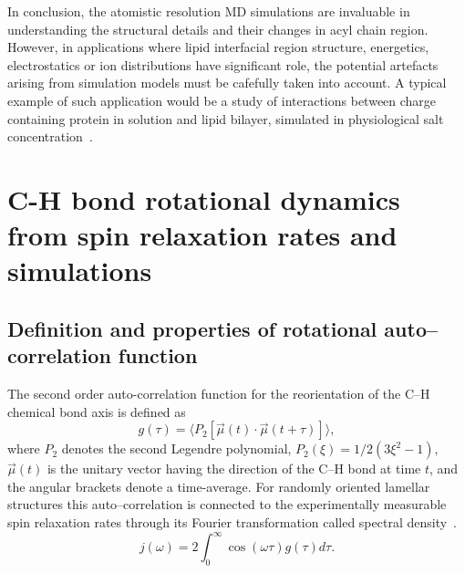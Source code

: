 \documentclass[aps,prl,superscriptaddress,twocolumn]{revtex4}
\begin{document}
In conclusion, the atomistic resolution MD simulations are invaluable in understanding the 
structural details and their changes in acyl chain region. However, in applications where 
lipid interfacial region structure, energetics, electrostatics or ion distributions have significant role,
the potential artefacts arising from simulation models must be cafefully taken into account.
A typical example of such application would be a study of interactions between charge containing protein in solution
and lipid bilayer, simulated in physiological salt concentration~\cite{arkhipov13,kaszuba15}.


\section{C-H bond rotational dynamics from spin relaxation rates and simulations}\label{dynamicsSECTION}

\subsection{Definition and properties of rotational auto--correlation function}
The second order auto-correlation function for the reorientation of the C--H chemical bond axis is defined as
\begin{equation}\label{gt}
g(\tau) = \langle P_2[\vec{\mu}(t)\cdot\vec{\mu}(t+\tau)]\rangle,
\end{equation} 
where $P_2$ denotes the second Legendre polynomial, $P_2(\xi) = 1/2 (3\xi^2 - 1)$, $\vec{\mu}(t)$ is the unitary vector having the 
direction of the C--H bond at time $t$, and the angular brackets denote a time-average. 
For randomly oriented lamellar structures this auto--correlation is connected to the experimentally 
measurable spin relaxation rates through its Fourier transformation called spectral density~\cite{harris86}.
\begin{equation}\label{FT}
j(\omega) =  2\int_0^{\infty} \cos(\omega \tau) g(\tau) d\tau.
\end{equation}
\end{document}
